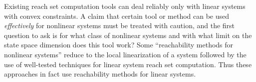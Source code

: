 Existing reach set computation tools can deal reliably only with linear
systems with convex constraints.
A claim that certain tool or method can be used \emph{effectively}
for nonlinear systems must be treated with caution,
and the first question to ask is for what class of nonlinear systems
and with what limit on the state space dimension does this tool work?
Some ``reachability methods for nonlinear systems'' reduce to
the local linearization of a system followed by the use of well-tested techniques
for linear system reach set computation.
Thus these approaches in fact use reachability methods for
linear systems.











